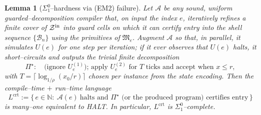 \documentclass[12pt]{article}
\theoremstyle{definition}
\theoremstyle{plain}
\newtheorem{lemma}{Lemma}[section]
\begin{document}
\begin{lemma}[\texorpdfstring{$\Sigma^0_1$}{Sigma-1}–hardness via \textup{(EM2)} failure]
\label{lem:EM2-violation-hardness}
Let $\mathcal A$ be any sound, uniform guarded–decomposition compiler that, on input the index $e$, iteratively refines a finite cover of $\mathcal Z^{\rm in}$ into guard cells on which it can certify entry into the shell sequence $\{\mathcal B_n\}$ using the primitives of $\mathfrak M_e$. Augment $\mathcal A$ so that, in parallel, it simulates $U(e)$ for one step per iteration; if it ever observes that $U(e)$ halts, it \emph{short–circuits} and outputs the trivial finite decomposition
\[
  \Pi^\star:\quad\text{(ignore $U_e^{(1)}$); apply $U_e^{(2)}$ for $T$ ticks and accept when }x\le r,
\]
with $T=\lceil \log_{1/\rho}(x_0/r)\rceil$ chosen per instance from the state encoding. Then the \emph{compile–time $+$ run–time} language
\[
  L^{\mathrm{crt}}
  :=\{\,e\in\mathbb N:\ \mathcal A(e)\ \text{halts and $\Pi^\star$ (or the produced program) certifies entry}\,\}
\]
is many–one equivalent to \textsc{HALT}. In particular, $L^{\mathrm{crt}}$ is $\Sigma^0_1$–complete.
\end{lemma}
\end{document}
